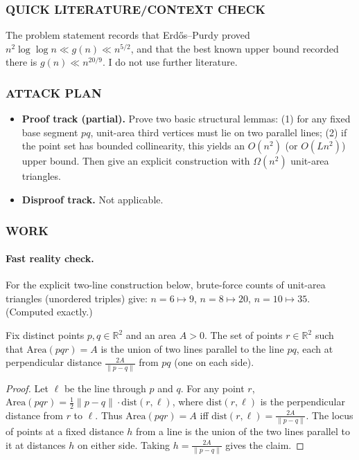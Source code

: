 \subsubsection*{QUICK LITERATURE/CONTEXT CHECK}
The problem statement records that Erd\H{o}s--Purdy proved
\(n^2\log\log n \ll g(n) \ll n^{5/2}\), and that the best known upper bound recorded there is
\(g(n)\ll n^{20/9}\). I do not use further literature.

\subsubsection*{ATTACK PLAN}
\begin{itemize}
\item \textbf{Proof track (partial).} Prove two basic structural lemmas:
(1) for any fixed base segment \(pq\), unit-area third vertices must lie on two parallel lines;
(2) if the point set has bounded collinearity, this yields an \(O(n^2)\) (or \(O(Ln^2)\)) upper bound.
Then give an explicit construction with \(\Omega(n^2)\) unit-area triangles.
\item \textbf{Disproof track.} Not applicable.
\end{itemize}

\subsubsection*{WORK}

\paragraph{Fast reality check.} For the explicit two-line construction below, brute-force counts of unit-area triangles (unordered triples) give:
\(n=6\mapsto 9\), \(n=8\mapsto 20\), \(n=10\mapsto 35\). (Computed exactly.)

\begin{lemma}
Fix distinct points \(p,q\in\mathbb{R}^2\) and an area \(A>0\). The set of points \(r\in\mathbb{R}^2\) such that \(\mathrm{Area}(pqr)=A\) is the union of two lines parallel to the line \(pq\), each at perpendicular distance \(\frac{2A}{\|p-q\|}\) from \(pq\) (one on each side).
\end{lemma}

\begin{proof}
Let \(\ell\) be the line through \(p\) and \(q\). For any point \(r\),
\(\mathrm{Area}(pqr)=\frac12\|p-q\|\cdot \mathrm{dist}(r,\ell)\), where \(\mathrm{dist}(r,\ell)\) is the perpendicular distance from \(r\) to \(\ell\).
Thus \(\mathrm{Area}(pqr)=A\) iff \(\mathrm{dist}(r,\ell)=\frac{2A}{\|p-q\|}\).
The locus of points at a fixed distance \(h\) from a line is the union of the two lines parallel to it at distances \(h\) on either side. Taking \(h=\frac{2A}{\|p-q\|}\) gives the claim.
\end{proof}

